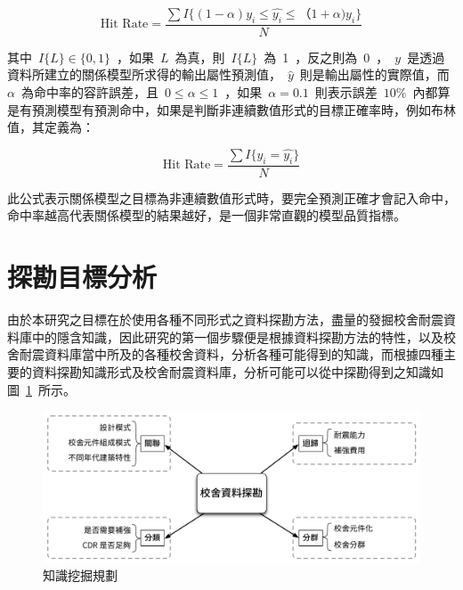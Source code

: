 \begin{equation} \text{Hit Rate} = \dfrac{ \sum{I\{(1 - \alpha)y_i \le \hat{y_i} \le（1 + \alpha)y_i \}} }{N} \label{eq:hitratenum}\end{equation} 

其中~$I\{L\} \in \{0, 1\}$~，如果~$L$~為真，則~$I\{L\}$~為~1~，反之則為~0~，~$y$~是透過資料所建立的關係模型所求得的輸出屬性預測值，~$\hat{y}$~則是輸出屬性的實際值，而~$\alpha$~為命中率的容許誤差，且~$0 \le \alpha \le 1$~，如果~$\alpha = 0.1$~則表示誤差~$10\%$~內都算是有預測模型有預測命中，如果是判斷非連續數值形式的目標正確率時，例如布林值，其定義為：

\begin{equation} \text{Hit Rate} = \dfrac{ \sum{I\{y_i = \hat{y_i}\}} }{N} \label{eq:hitrate}\end{equation} 

此公式表示關係模型之目標為非連續數值形式時，要完全預測正確才會記入命中，命中率越高代表關係模型的結果越好，是一個非常直觀的模型品質指標。



\section{探勘目標分析}

由於本研究之目標在於使用各種不同形式之資料探勘方法，盡量的發掘校舍耐震資料庫中的隱含知識，因此研究的第一個步驟便是根據資料探勘方法的特性，以及校舍耐震資料庫當中所及的各種校舍資料，分析各種可能得到的知識，而根據四種主要的資料探勘知識形式及校舍耐震資料庫，分析可能可以從中探勘得到之知識如圖~\ref{fig:bigpicture}~所示。

\begin{figure}[hbtp]
  \begin{center}
    \includegraphics[width=1.0\textwidth]{figures/big-picture.pdf}
    \caption{知識挖掘規劃} 
    \label{fig:bigpicture}
  \end{center}
\end{figure}

